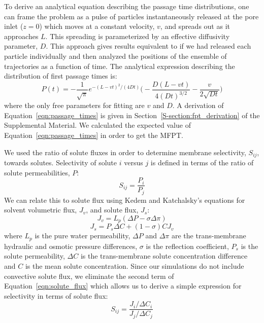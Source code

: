 \documentclass[aps,pre,preprint,groupedaddress,longbibliography]{revtex4-2}
\begin{document}
  To derive an analytical equation describing the passage time distributions,
  one can frame the problem as a pulse of particles instantaneously released at
  the pore inlet ($z=0$) which moves at a constant velocity, $v$, and spreads
  out as it approaches $L$. This spreading is parameterized by an effective
  diffusivity parameter, $D$. This approach gives results equivalent to if we
  had released each particle individually and then analyzed the positions of
  the ensemble of trajectories as a function of time. The analytical expression
  describing the distribution of first passage times
  is:~\cite{cussler_diffusion:_2009}
  \begin{equation}
  P(t) = -\frac{1}{\sqrt{\pi}}e^{-(L - vt)^2 / (4Dt)}\bigg(-\frac{D(L - vt)}{4(Dt)^{3/2}} - \frac{v}{2\sqrt{Dt}}\bigg)
  \label{eqn:passage_times}
  \end{equation} 
  where the only free parameters for fitting are $v$ and $D$. A derivation of
  Equation~\ref{eqn:passage_times} is given in
  Section~\ref{S-section:fpt_derivation} of the Supplemental Material. We
  calculated the expected value of Equation~\ref{eqn:passage_times} in order to
  get the MFPT.

  We used the ratio of solute fluxes in order to determine membrane
  selectivity, $S_{ij}$, towards solutes. Selectivity of solute $i$ versus $j$
  is defined in terms of the ratio of solute permeabilities,
  $P$:~\cite{guo_pervaporation_2004}
  \begin{equation}
  S_{ij} = \frac{P_i}{P_j}
  \end{equation}
  We can relate this to solute flux using Kedem and Katchalsky's equations for
  solvent volumetric flux, $J_v$, and solute flux,
  $J_s$:~\cite{kedem_permeability_1963,al-zoubi_rejection_2007}
  \begin{equation}
  J_v = L_p(\Delta P - \sigma\Delta \pi)
  \end{equation} 
  \begin{equation}
  J_s = P_s \Delta C + (1 - \sigma)CJ_v
  \label{eqn:solute_flux}
  \end{equation}
  where $L_p$ is the pure water permeability, $\Delta P$ and $\Delta \pi$ are
  the trans-membrane hydraulic and osmotic pressure differences, $\sigma$ is
  the reflection coefficient, $P_s$ is the solute permeability, $\Delta C$ is
  the trans-membrane solute concentration difference and $C$ is the mean solute
  concentration. Since our simulations do not include convective solute flux,
  we eliminate the second term of Equation~\ref{eqn:solute_flux} which allows
  us to derive a simple expression for selectivity in terms of solute flux:
  \begin{equation}
  S_{ij} = \frac{J_i / \Delta C_i}{J_j / \Delta C_j}
  \label{eqn:selectivity}
  \end{equation}
  
\end{document}

